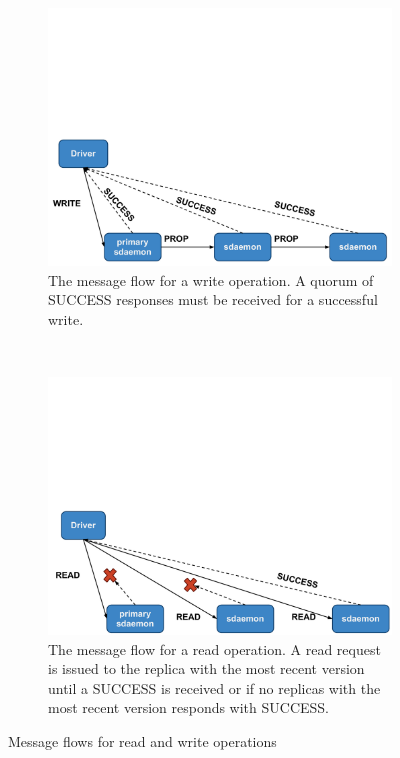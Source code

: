 \begin{figure}[t]
    \begin{subfigure}{0.5\textwidth}
        \includegraphics[width=\textwidth, trim=0 0 0 3.5in, clip]{./figures/write.pdf}
        \caption{The message flow for a write operation. A quorum of SUCCESS 
                 responses must be received for a successful write.}
        \label{fig:write}
    \end{subfigure}
    ~
    \begin{subfigure}{0.5\textwidth}
        \includegraphics[width=\textwidth, trim=0 0 0 3.5in, clip]{./figures/read.pdf}
        \caption{The message flow for a read operation. A read request is 
            issued to the replica with the most recent version until a 
            SUCCESS is received or if no replicas with the most recent 
            version responds with SUCCESS.}
        \label{fig:read}
    \end{subfigure}
    \caption{Message flows for read and write operations}
\end{figure}


